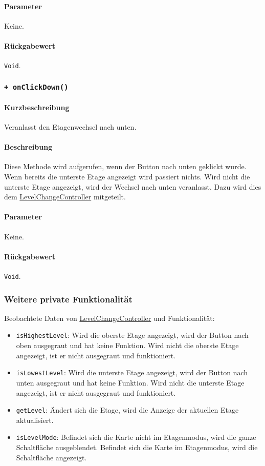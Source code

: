 \paragraph*{Parameter}
Keine.
\paragraph*{Rückgabewert}
\texttt{Void}.

\subsubsection*{\texttt{+ onClickDown()}}%
\paragraph*{Kurzbeschreibung}
Veranlasst den Etagenwechsel nach unten.
\paragraph*{Beschreibung}
Diese Methode wird aufgerufen, wenn der Button nach unten geklickt wurde. \\
Wenn bereits die unterste Etage angezeigt wird passiert nichts. 
Wird nicht die unterste Etage angezeigt, wird der Wechsel nach unten veranlasst.
Dazu wird dies dem \hyperref[App_Map_ViewModel_LevelChangeController]{LevelChangeController} mitgeteilt.
\paragraph*{Parameter}
Keine.
\paragraph*{Rückgabewert}
\texttt{Void}.

\subsubsection*{Weitere private Funktionalität}%
Beobachtete Daten von \hyperref[App_Map_ViewModel_LevelChangeController]{LevelChangeController} und Funktionalität:
\begin{itemize}
    \item \texttt{isHighestLevel}: Wird die oberste Etage angezeigt, wird der Button nach oben ausgegraut 
    und hat keine Funktion. Wird nicht die oberste Etage angezeigt, ist er nicht ausgegraut und funktioniert.
    \item \texttt{isLowestLevel}: Wird die unterste Etage angezeigt, wird der Button nach unten ausgegraut 
    und hat keine Funktion. Wird nicht die unterste Etage angezeigt, ist er nicht ausgegraut und funktioniert.
    \item \texttt{getLevel}: Ändert sich die Etage, wird die Anzeige der aktuellen Etage aktualisiert.
    \item \texttt{isLevelMode}: Befindet sich die Karte nicht im Etagenmodus, wird die ganze Schaltfläche ausgeblendet.
    Befindet sich die Karte im Etagenmodus, wird die Schaltfläche angezeigt.
\end{itemize}
